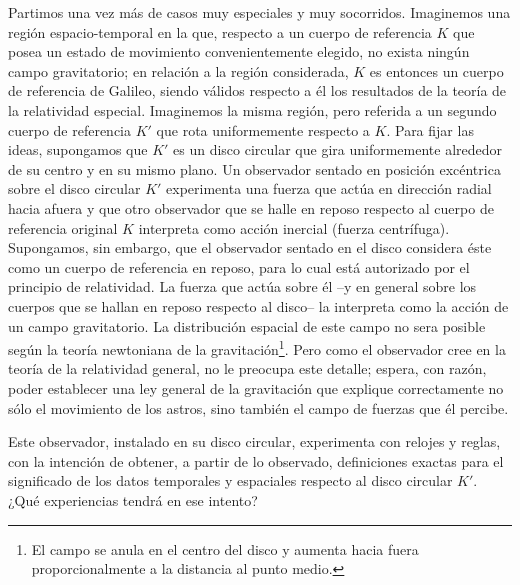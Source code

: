 \documentclass[spanish]{book}
\begin{document}
Partimos una vez más de casos muy especiales y muy socorridos. Imaginemos una
región espacio-temporal en la que, respecto a un cuerpo de referencia $K$ que posea
un estado de movimiento convenientemente elegido, no exista ningún campo
gravitatorio; en relación a la región considerada, $K$ es entonces un cuerpo de
referencia de Galileo, siendo válidos respecto a él los resultados de la teoría de la
relatividad especial. Imaginemos la misma región, pero referida a un segundo cuerpo
de referencia $K'$ que rota uniformemente respecto a $K$. Para fijar las ideas,
supongamos que $K'$ es un disco circular que gira uniformemente alrededor de su
centro y en su mismo plano. Un observador sentado en posición excéntrica sobre el
disco circular $K'$ experimenta una fuerza que actúa en dirección radial hacia afuera y
que otro observador que se halle en reposo respecto al cuerpo de referencia original $K$
interpreta como acción inercial (fuerza centrífuga). Supongamos, sin embargo, que el
observador sentado en el disco considera éste como un cuerpo de referencia en
reposo, para lo cual está autorizado por el principio de relatividad. La fuerza que
actúa sobre él --y en general sobre los cuerpos que se hallan en reposo respecto al
disco-- la interpreta como la acción de un campo gravitatorio. La distribución espacial
de este campo no sera posible según la teoría newtoniana de la gravitación\footnote{El
campo se anula en el centro del disco y aumenta hacia fuera proporcionalmente a la 
distancia al punto medio.}. Pero como el observador cree en la teoría de la relatividad
general, no le preocupa este
detalle; espera, con razón, poder establecer una ley general de la gravitación que
explique correctamente no sólo el movimiento de los astros, sino también el campo de
fuerzas que él percibe.

Este observador, instalado en su disco circular, experimenta con relojes y reglas, con
la intención de obtener, a partir de lo observado, definiciones exactas para el
significado de los datos temporales y espaciales respecto al disco circular $K'$. ¿Qué
experiencias tendrá en ese intento?
\end{document}
